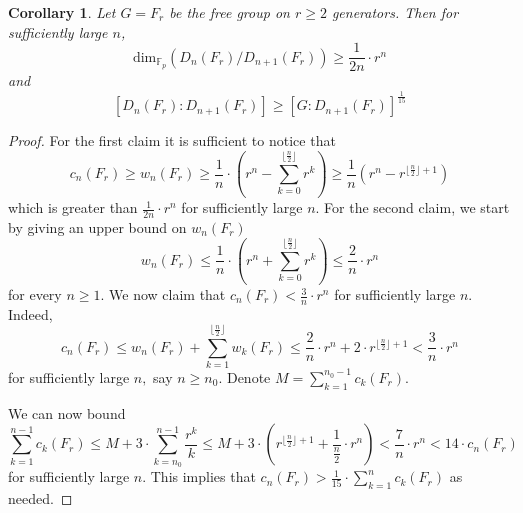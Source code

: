 \documentclass[10pt,a4paper]{amsart}
\newtheorem{corollary}[theorem]{Corollary}
\begin{document}
\setcounter{section}{2}
\setcounter{equation}{0}
\setcounter{theorem}{6}
\begin{corollary}
\label{exponential growth}
Let $G = F_r$ be the free group on $r \geq 2$ generators. Then for sufficiently large $n$,
$$\mathrm{dim}_{\mathbb{F}_p}(D_n(F_r) / D_{n+1}(F_r)) \geq \frac{1}{2n} \cdot r^n$$ and
$$[D_n(F_r): D_{n+1}(F_r)] \geq [G: D_{n + 1}(F_r)]^{\frac{1}{15}}$$
\end{corollary}
\begin{proof}
For the first claim it is sufficient to notice that $$c_n(F_r) \geq w_n(F_r) \geq \frac{1}{n} \cdot (r^n - \sum_{k=0}^{\lfloor\frac{n}{2}\rfloor} r^k) \geq \frac{1}{n}(r^n - r^{\lfloor\frac{n}{2}\rfloor + 1})$$
which is greater than $\frac{1}{2n} \cdot r^n$ for sufficiently large $n$.
For the second claim, we start by giving an upper bound on $w_n(F_r)$
$$w_n(F_r) \leq \frac{1}{n} \cdot (r^n + \sum_{k=0}^{\lfloor\frac{n}{2}\rfloor} r^k) \leq \frac{2}{n} \cdot r^n$$
for every $n \geq 1$. We now claim that $c_n(F_r) < \frac{3}{n} \cdot r^n$ for sufficiently large $n.$ Indeed, $$c_n(F_r) \leq w_n(F_r) + \sum_{k=1}^{\lfloor\frac{n}{2}\rfloor} w_k(F_r)\leq \frac{2}{n} \cdot r^n + 2\cdot r^{\lfloor\frac{n}{2}\rfloor + 1} < \frac{3}{n} \cdot r^n$$
for sufficiently large $n,$ say $n \geq n_0$. Denote $M = \sum_{k=1}^{n_0 - 1}c_k(F_r)$.

We can now bound $$\sum_{k = 1}^{n - 1} c_k(F_r) \leq M + 3 \cdot \sum_{k=n_0}^{n - 1} \frac{r^k}{k} \leq M + 3 \cdot (r^{\lfloor \frac{n}{2} \rfloor + 1} + \frac{1}{\frac{n}{2}} \cdot r^n) < \frac{7}{n}  \cdot r^n < 14 \cdot c_n(F_r)$$ for sufficiently large $n.$ This implies that $c_n(F_r) > \frac{1}{15} \cdot \sum_{k=1}^n c_k(F_r)$ as needed.
\end{proof}
\end{document}
